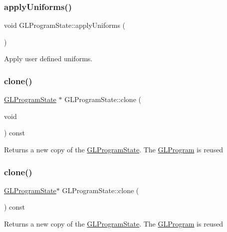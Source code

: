 \subsubsection{\texorpdfstring{apply\+Uniforms()}{applyUniforms()}\hspace{0.1cm}{\footnotesize\ttfamily [2/2]}}
{\footnotesize\ttfamily void G\+L\+Program\+State\+::apply\+Uniforms (\begin{DoxyParamCaption}{ }\end{DoxyParamCaption})}

Apply user defined uniforms. \mbox{\label{classGLProgramState_a60985933fbcc9d05da3765aa770c37ab}} 
\subsubsection{\texorpdfstring{clone()}{clone()}\hspace{0.1cm}{\footnotesize\ttfamily [1/2]}}
{\footnotesize\ttfamily \hyperlink{classGLProgramState}{G\+L\+Program\+State} $\ast$ G\+L\+Program\+State\+::clone (\begin{DoxyParamCaption}\item[{void}]{ }\end{DoxyParamCaption}) const}

Returns a new copy of the \hyperlink{classGLProgramState}{G\+L\+Program\+State}. The \hyperlink{classGLProgram}{G\+L\+Program} is reused \mbox{\label{classGLProgramState_adead71e82d66f5d93b73871f3766eb7a}} 
\subsubsection{\texorpdfstring{clone()}{clone()}\hspace{0.1cm}{\footnotesize\ttfamily [2/2]}}
{\footnotesize\ttfamily \hyperlink{classGLProgramState}{G\+L\+Program\+State}$\ast$ G\+L\+Program\+State\+::clone (\begin{DoxyParamCaption}{ }\end{DoxyParamCaption}) const}

Returns a new copy of the \hyperlink{classGLProgramState}{G\+L\+Program\+State}. The \hyperlink{classGLProgram}{G\+L\+Program} is reused \mbox{\label{classGLProgramState_a8a38bac19b6c031450de5d296a06cff1}} 
